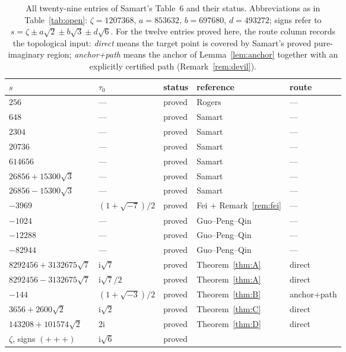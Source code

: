 \documentclass[11pt]{article}
\newcommand{\ii}{\mathrm{i}}
\theoremstyle{definition}
\theoremstyle{remark}
\begin{document}
\begin{table}[htb]
\centering\scriptsize
\caption{All twenty-nine entries of Samart's Table~6 \cite{Sa15} and
their status. Abbreviations as in Table~\ref{tab:open}:
$\zeta=1207368$, $a=853632$, $b=697680$, $d=493272$; signs refer to
$s=\zeta\pm a\sqrt2\pm b\sqrt3\pm d\sqrt6$. For the twelve entries
proved here, the route column records the topological input:
\emph{direct} means the target point is covered by Samart's proved
pure-imaginary region; \emph{anchor+path} means the anchor of
Lemma~\ref{lem:anchor} together with an explicitly certified path
(Remark~\ref{rem:devil}).}
\label{tab:master29}
\setlength{\tabcolsep}{4pt}
\begin{tabular}{lllll}
\toprule
$s$ & $\tau_0$ & status & reference & route\\
\midrule
$256$ & --- & proved & Rogers \cite{Ro} & ---\\
$648$ & --- & proved & Samart \cite{Sa13} & ---\\
$2304$ & --- & proved & Samart \cite{Sa13} & ---\\
$20736$ & --- & proved & Samart \cite{Sa13} & ---\\
$614656$ & --- & proved & Samart \cite{Sa13} & ---\\
$26856+15300\sqrt3$ & --- & proved & Samart \cite[Thm.~3.1]{Sa15} &
  ---\\
$26856-15300\sqrt3$ & --- & proved & Samart \cite[Thm.~3.1]{Sa15} &
  ---\\
$-3969$ & $(1+\sqrt{-7})/2$ & proved & Fei \cite{Fei} +
  Remark~\ref{rem:fei} & ---\\
$-1024$ & --- & proved & Guo--Peng--Qin \cite{GPQ} & ---\\
$-12288$ & --- & proved & Guo--Peng--Qin \cite{GPQ} & ---\\
$-82944$ & --- & proved & Guo--Peng--Qin \cite{GPQ} & ---\\
\midrule
$8292456+3132675\sqrt7$ & $\ii\sqrt7$ & proved & Theorem~\ref{thm:A}
  & direct\\
$8292456-3132675\sqrt7$ & $\ii\sqrt7/2$ & proved & Theorem~\ref{thm:A}
  & direct\\
$-144$ & $(1+\sqrt{-3})/2$ & proved & Theorem~\ref{thm:B} &
  anchor+path\\
$3656+2600\sqrt2$ & $\ii\sqrt2$ & proved & Theorem~\ref{thm:C} &
  direct\\
$143208+101574\sqrt2$ & $2\ii$ & proved & Theorem~\ref{thm:D} &
  direct\\
$\zeta$, signs $({+}{+}{+})$ & $\ii\sqrt6$ & proved &

\end{tabular}
\end{table}
\end{document}
